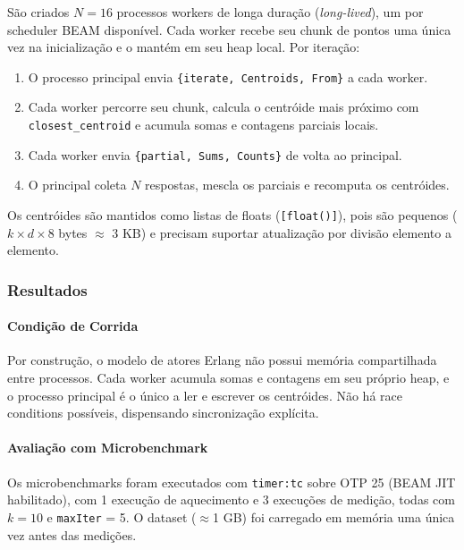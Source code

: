 São criados $N = 16$ processos workers de longa duração (\textit{long-lived}),
um por scheduler BEAM disponível. Cada worker recebe seu chunk de pontos uma
única vez na inicialização e o mantém em seu heap local. Por iteração:

\begin{enumerate}
    \item O processo principal envia \texttt{\{iterate, Centroids, From\}} a cada worker.
    \item Cada worker percorre seu chunk, calcula o centróide mais próximo
          com \texttt{closest\_centroid} e acumula somas e contagens parciais locais.
    \item Cada worker envia \texttt{\{partial, Sums, Counts\}} de volta ao principal.
    \item O principal coleta $N$ respostas, mescla os parciais e recomputa os centróides.
\end{enumerate}

Os centróides são mantidos como listas de floats (\texttt{[float()]}),
pois são pequenos ($k \times d \times 8$ bytes $\approx$ 3 KB) e
precisam suportar atualização por divisão elemento a elemento.

\subsubsection{Resultados}

\paragraph{Condição de Corrida}

Por construção, o modelo de atores Erlang não possui memória compartilhada entre
processos. Cada worker acumula somas e contagens em seu próprio heap, e o
processo principal é o único a ler e escrever os centróides. Não há race
conditions possíveis, dispensando sincronização explícita.

\paragraph{Avaliação com Microbenchmark}

Os microbenchmarks foram executados com \texttt{timer:tc} sobre OTP 25 (BEAM JIT
habilitado), com 1 execução de aquecimento e 3 execuções de medição, todas com
$k = 10$ e \texttt{maxIter} = 5. O dataset ($\approx$1 GB) foi carregado em
memória uma única vez antes das medições.

